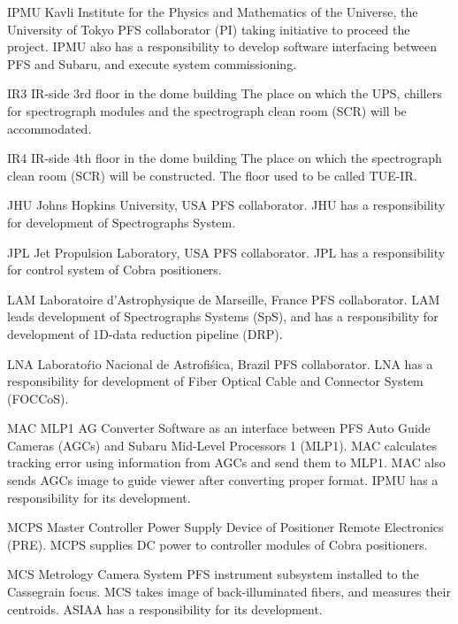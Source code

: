 {IPMU}
{Kavli Institute for the Physics and Mathematics of the Universe, the University of Tokyo}
{PFS collaborator (PI) taking initiative to proceed the project. IPMU also has a responsibility to develop software interfacing between PFS and Subaru, and execute system commissioning.}


{IR3}
{IR-side 3rd floor in the dome building }
{The place on which the UPS, chillers for spectrograph modules and the spectrograph clean room (SCR) will be accommodated.}


{IR4}
{IR-side 4th floor in the dome building }
{The place on which the spectrograph clean room (SCR) will be constructed. The floor used to be called TUE-IR.}


{JHU}
{Johns Hopkins University, USA}
{PFS collaborator. JHU has a responsibility for development of Spectrographs System.}


{JPL}
{Jet Propulsion Laboratory, USA}
{PFS collaborator. JPL has a responsibility for control system of Cobra positioners.}


{LAM}
{Laboratoire d'Astrophysique de Marseille, France}
{PFS collaborator. LAM leads development of Spectrographs Systems (SpS), and has a responsibility for development of 1D-data reduction pipeline (DRP).}


{LNA}
{Laborato\'rio Nacional de Astrofi\'sica, Brazil}
{PFS collaborator. LNA has a responsibility for development of Fiber Optical Cable and Connector System (FOCCoS).}


{MAC}
{MLP1 AG Converter}
{Software as an interface between PFS Auto Guide Cameras (AGCs) and Subaru Mid-Level Processors 1 (MLP1). MAC calculates tracking error using information from AGCs and send them to MLP1. MAC also sends AGCs image to guide viewer after converting proper format. IPMU has a responsibility for its development.}


{MCPS}
{Master Controller Power Supply}
{Device of Positioner Remote Electronics (PRE). MCPS supplies DC power to controller modules of Cobra positioners.}


{MCS}
{Metrology Camera System}
{PFS instrument subsystem installed to the Cassegrain focus. MCS takes image of back-illuminated fibers, and measures their centroids. ASIAA has a responsibility for its development.}


